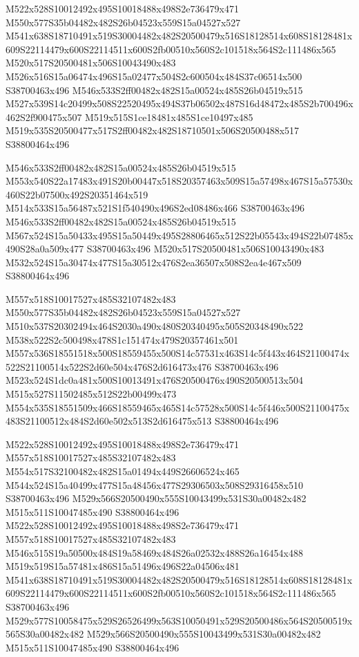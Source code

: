 \documentclass{article}
\begin{document}
\begin{multicols}{2}
M522x528S10012492x495S10018488x498S2e736479x471 M550x577S35b04482x482S26b04523x559S15a04527x527 M541x638S18710491x519S30004482x482S20500479x516S18128514x608S18128481x609S22114479x600S22114511x600S2fb00510x560S2c101518x564S2c111486x565 M520x517S20500481x506S10043490x483 M526x516S15a06474x496S15a02477x504S2c600504x484S37c06514x500 S38700463x496 M546x533S2ff00482x482S15a00524x485S26b04519x515 M527x539S14c20499x508S22520495x494S37b06502x487S16d48472x485S2b700496x462S2f900475x507 M519x515S1ce18481x485S1ce10497x485 M519x535S20500477x517S2ff00482x482S18710501x506S20500488x517 S38800464x496

M546x533S2ff00482x482S15a00524x485S26b04519x515 M553x540S22a17483x491S20b00447x518S20357463x509S15a57498x467S15a57530x460S22b07500x492S20351464x519 M514x533S15a56487x521S1f540490x496S2ed08486x466 S38700463x496 M546x533S2ff00482x482S15a00524x485S26b04519x515 M567x524S15a50433x495S15a50449x495S28806465x512S22b05543x494S22b07485x490S28a0a509x477 S38700463x496 M520x517S20500481x506S10043490x483 M532x524S15a30474x477S15a30512x476S2ea36507x508S2ea4e467x509 S38800464x496

M557x518S10017527x485S32107482x483 M550x577S35b04482x482S26b04523x559S15a04527x527 M510x537S20302494x464S2030a490x480S20340495x505S20348490x522 M538x522S2c500498x478S1c151474x479S20357461x501 M557x536S18551518x500S18559455x500S14c57531x463S14c5f443x464S21100474x522S21100514x522S2d60e504x476S2d616473x476 S38700463x496 M523x524S1dc0a481x500S10013491x476S20500476x490S20500513x504 M515x527S11502485x512S22b00499x473 M554x535S18551509x466S18559465x465S14c57528x500S14c5f446x500S21100475x483S21100512x484S2d60e502x513S2d616475x513 S38800464x496

M522x528S10012492x495S10018488x498S2e736479x471 M557x518S10017527x485S32107482x483 M554x517S32100482x482S15a01494x449S26606524x465 M544x524S15a40499x477S15a48456x477S29306503x508S29316458x510 S38700463x496 M529x566S20500490x555S10043499x531S30a00482x482 M515x511S10047485x490 S38800464x496 M522x528S10012492x495S10018488x498S2e736479x471 M557x518S10017527x485S32107482x483 M546x515S19a50500x484S19a58469x484S26a02532x488S26a16454x488 M519x519S15a57481x486S15a51496x496S22a04506x481 M541x638S18710491x519S30004482x482S20500479x516S18128514x608S18128481x609S22114479x600S22114511x600S2fb00510x560S2c101518x564S2c111486x565 S38700463x496 M529x577S10058475x529S26526499x563S10050491x529S20500486x564S20500519x565S30a00482x482 M529x566S20500490x555S10043499x531S30a00482x482 M515x511S10047485x490 S38800464x496


\end{multicols}
\end{document}
